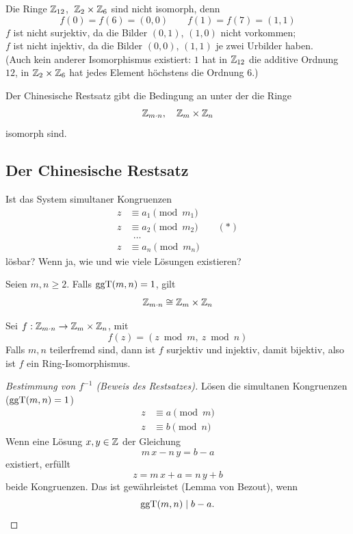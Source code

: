 \begin{beispiel}
Die Ringe $\mathbb{Z}_{12}$, $\;\mathbb{Z}_{2} \times \mathbb{Z}_{6}$ sind nicht isomorph, denn
\[ f(0) = f(6) = (0,0) \qquad f(1) = f(7) = (1,1) \]
$f$ ist nicht surjektiv, da die Bilder $(0, 1)$, $(1, 0)$ nicht vorkommen;\\
$f$ ist nicht injektiv, da die Bilder $(0, 0)$, $(1, 1)$ je zwei Urbilder haben.\\
(Auch kein anderer Isomorphismus existiert: $1$ hat in $\mathbb{Z}_{12}$ die additive Ordnung $12$, in $\mathbb{Z}_{2} \times \mathbb{Z}_{6}$ hat jedes Element höchstens die Ordnung $6$.)
\end{beispiel}

Der Chinesische Restsatz gibt die Bedingung an unter der die Ringe
\[ \mathbb{Z}_{m \cdot n}, \quad \mathbb{Z}_{m} \times \mathbb{Z}_{n} \]
isomorph sind.

\subsection{Der Chinesische Restsatz}

Ist das System simultaner Kongruenzen
\begin{align*}
z &\equiv a_1 \pmod{m_1} \\
z &\equiv a_2 \pmod{m_2} \qquad (*) \\
&\ \ \ldots \\
z &\equiv a_n \pmod{m_n}
\end{align*}
lösbar? Wenn ja, wie und wie viele Lösungen existieren?

\begin{satz}
Seien $m, n \geq 2$. Falls $\operatorname{ggT}(m, n) = 1$, gilt
\[ \mathbb{Z}_{m \cdot n} \cong \mathbb{Z}_{m} \times \mathbb{Z}_{n} \]
\end{satz}

Sei $f : \mathbb{Z}_{m \cdot n} \to \mathbb{Z}_{m} \times \mathbb{Z}_{n}$, mit
\[ f(z) = (z \bmod m,\ z \bmod n) \]
Falls $m, n$ teilerfremd sind, dann ist $f$ surjektiv und injektiv, damit bijektiv, also ist $f$ ein Ring-Isomorphismus.

\begin{proof}[Bestimmung von $f^{-1}$ (Beweis des Restsatzes)]
Lösen die simultanen Kongruenzen ($\operatorname{ggT}(m, n) = 1$)
\begin{align*}
z &\equiv a \pmod{m} \\
z &\equiv b \pmod{n}
\end{align*}
Wenn eine Lösung $x, y \in \mathbb{Z}$ der Gleichung
\[ m\,x - n\,y = b - a \]
existiert, erfüllt
\[ z = m\,x + a = n\,y + b \]
beide Kongruenzen. Das ist gewährleistet (Lemma von Bezout), wenn
\[ \operatorname{ggT}(m, n) \mid b - a. \qedhere \]
\end{proof}

